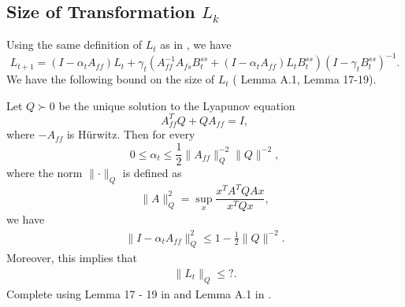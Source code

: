 \subsection{Size of Transformation $L_k$}
Using the same definition of $L_t$ as in \citep{konda2004convergence}, we have
\begin{equation}
    L_{t+1} = (I - \alpha_t A_{ff}) L_t + \gamma_t \left(
        A_{ff}^{-1} A_{fs} B^{ss}_t + (I - \alpha_t A_{ff})L_t B^{ss}_t
    \right)(I - \gamma_t B^{ss}_t)^{-1} .
\end{equation}
We have the following bound on the size of $L_t$ (\citet{konda2004convergence} Lemma A.1, \citet{kaledin2020finite} Lemma 17-19).
\begin{lemma}\label{lem:Ltsize}
    Let $Q \succ 0$ be the unique solution to the Lyapunov equation
    \begin{equation}
        A_{ff}^T Q + Q A_{ff} = I ,
    \end{equation}
    where $-A_{ff}$ is H\"{u}rwitz. Then for every 
    \begin{equation}
        0 \leq \alpha_t \leq \frac{1}{2} \lVert A_{ff}\rVert_Q^{-2} \lVert Q \rVert^{-2} ,
    \end{equation}
    where the norm $\lVert \cdot \rVert_Q$ is defined as
    \begin{equation}
        \lVert A \rVert_Q^2 = \sup_x \frac{x^T A^T Q A x}{x^T Q x} ,
    \end{equation}
    we have
    \begin{align*}
        \lVert I - \alpha_t A_{ff} \rVert_Q^2 \leq 1 - \frac{1}{2} \lVert Q \rVert^{-2} .
    \end{align*}
    Moreover, this implies that 
    \begin{align*}
        \lVert L_{t} \rVert_Q \leq ? .
    \end{align*}
    {\color{red}Complete using Lemma 17 - 19 in \citep{kaledin2020finite} and Lemma A.1 in \citep{konda2004convergence}.}
\end{lemma}



